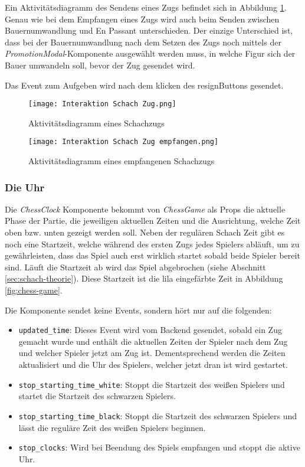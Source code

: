 Ein Aktivitätsdiagramm des Sendens eines Zugs befindet sich in Abbildung \ref{fig:chess-move}. Genau wie bei dem Empfangen eines Zugs wird auch beim Senden zwischen Bauernumwandlung und En Passant unterschieden. Der einzige Unterschied ist, dass bei der Bauernumwandlung nach dem Setzen des Zugs noch mittels der  \textit{PromotionModal}-Komponente ausgewählt werden muss, in welche Figur sich der Bauer umwandeln soll, bevor der Zug gesendet wird.

Das Event zum Aufgeben wird nach dem klicken des \glqq resign\grqq{ }Buttons gesendet.


      \begin{figure}[h]
      \centering
  \texttt{[image: Interaktion Schach Zug.png]}
  \caption{Aktivitätsdiagramm eines Schachzugs}
  \label{fig:chess-move}
\end{figure}

      \begin{figure}[h]
      \centering
  \texttt{[image: Interaktion Schach Zug empfangen.png]}
  \caption{Aktivitätsdiagramm eines empfangenen Schachzugs}
  \label{fig:chess-opponent-move}
\end{figure}

        \subsubsection{Die Uhr}
        \label{sec:Frontend-Uhr}
Die \textit{ChessClock} Komponente bekommt von \textit{ChessGame} als Props die aktuelle Phase der Partie, die jeweiligen aktuellen Zeiten und die Ausrichtung, welche Zeit oben bzw. unten gezeigt werden soll. Neben der regulären Schach Zeit gibt es noch eine Startzeit, welche während des ersten Zugs jedes Spielers abläuft, um zu gewährleisten, dass das Spiel auch erst wirklich startet sobald beide Spieler bereit sind. Läuft die Startzeit ab wird das Spiel abgebrochen (siehe Abschnitt \ref{sec:schach-theorie}). Diese Startzeit ist die lila eingefärbte Zeit in Abbildung \ref{fig:chess-game}.

Die Komponente sendet keine Events, sondern hört nur auf die folgenden:
\begin{itemize}
\item \verb|updated_time|: Dieses Event wird vom Backend gesendet, sobald ein Zug gemacht wurde und enthält die aktuellen Zeiten der Spieler nach dem Zug und welcher Spieler jetzt am Zug ist. Dementsprechend werden die Zeiten aktualisiert und die Uhr des Spielers, welcher jetzt dran ist wird gestartet.
\item \verb|stop_starting_time_white|: Stoppt die Startzeit des weißen Spielers und startet die Startzeit des schwarzen Spielers.
\item \verb|stop_starting_time_black|: Stoppt die Startzeit des schwarzen Spielers und lässt die reguläre Zeit des weißen Spielers beginnen.
\item \verb|stop_clocks|: Wird bei Beendung des Spiels empfangen und stoppt die aktive Uhr.
\end{itemize}

